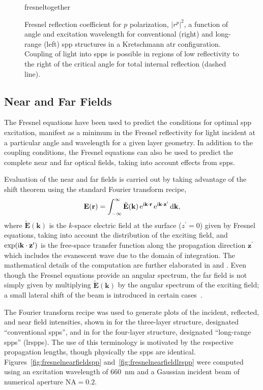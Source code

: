 \begin{figure}[ht]
\centering
{fresneltogether}
\caption{Fresnel reflection coefficient for $p$ polarization, $|r^p|^2$, a
function of angle and excitation wavelength for conventional (right) and
long-range (left) \gls{spp} structures in a Kretschmann \gls{atr} configuration.
Coupling of light into \glspl{spp} is possible in regions of low reflectivity to the right of the
critical angle for total internal reflection (dashed line).}
\label{fig:fresnelangle}
\end{figure}

\subsection{Near and Far Fields}\label{sec:fresnelnearfar}
The Fresnel equations have been used to predict the conditions for
optimal \gls{spp} excitation, manifest as a minimum in the Fresnel reflectivity
for light incident at a particular angle and wavelength for a given layer
geometry.  In addition to the coupling conditions, the Fresnel equations
can also be used to predict the complete near and far optical fields,
taking into account effects from \glspl{spp}.

Evaluation of the near and far fields is carried out by taking advantage of
the shift theorem using the standard Fourier transform recipe,
\begin{equation}
\mathbf{E}(\mathbf{r}) = \int_{-\infty}^{\infty} \tilde{\mathbf{E}}(\mathbf{k})
\,{\mathrm{e}}^{{\mathrm{i}} \mathbf{k} \cdot \mathbf{r}}
\,{\mathrm{e}}^{{\mathrm{i}} \mathbf{k} \cdot \mathbf{z}^\prime} \,\mathrm{d} \mathbf{k},
\end{equation}
where $\tilde{\mathbf{E}}(\mathbf{k})$ is the $k$-space electric field at
the surface ($z^\prime=0$) given by Fresnel equations, taking into account
the distribution of the exciting field, and $\exp({\mathrm{i}} \mathbf{k} \cdot
\mathbf{z}^\prime)$ is the free-space transfer function along the
propagation direction $\mathbf{z}^\prime$ which includes the evanescent
wave due to the domain of integration.  The mathematical details of the
computation are further elaborated in  and
.  Even though the Fresnel equations provide
an angular spectrum, the far field is not simply given by multiplying
$\tilde{\mathbf{E}}(\mathbf{k})$ by the angular spectrum of the exciting
field; a small lateral shift of the beam is introduced in certain
cases~\cite{chuang1986lateral}.

The Fourier transform recipe was used to generate plots of the incident,
reflected, and near field intensities, shown in
 for the three-layer structure, designated
``conventional \glspl{spp}'', and in  for the
four-layer structure, designated ``long-range \glspl{spp}'' (\glspl{lrspp}).  The use of
this terminology is motivated by the respective propagation lengths,
though physically the \glspl{spp} are identical.
Figures~\ref{fig:fresnelnearfieldspp} and~\ref{fig:fresnelnearfieldlrspp}
were computed using an excitation wavelength of \SI{660}{\nano\meter}
and a Gaussian incident beam of numerical aperture $\mathrm{NA}=0.2$.


